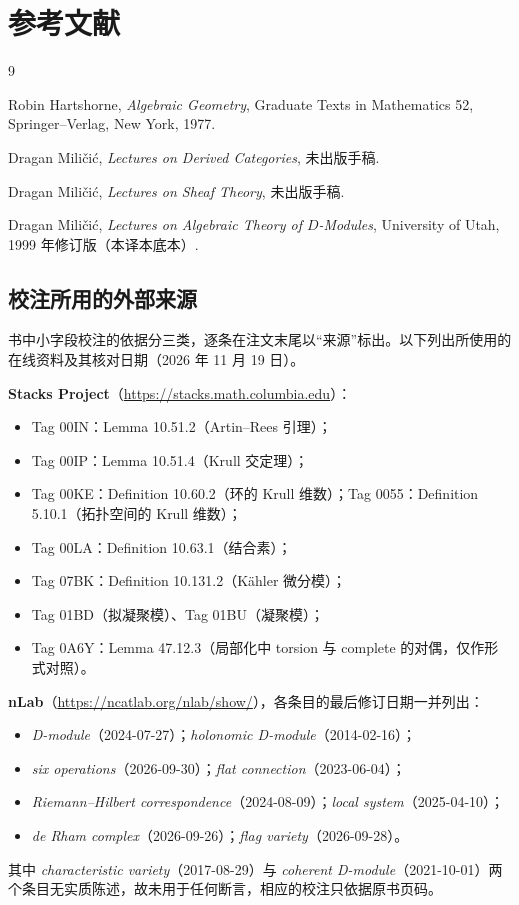 \chapter*{参考文献}

\begin{thebibliography}{9}

 Robin Hartshorne, \emph{Algebraic Geometry}, Graduate Texts in Mathematics 52, Springer--Verlag, New York, 1977.

 Dragan Miličić, \emph{Lectures on Derived Categories}, 未出版手稿.

 Dragan Miličić, \emph{Lectures on Sheaf Theory}, 未出版手稿.

 Dragan Miličić, \emph{Lectures on Algebraic Theory of $D$-Modules}, University of Utah, 1999 年修订版（本译本底本）.

\end{thebibliography}

\section*{校注所用的外部来源}

书中小字段校注的依据分三类，逐条在注文末尾以“来源”标出。以下列出所使用的在线资料及其核对日期（2026 年 11 月 19 日）。

\textbf{Stacks Project}（\url{https://stacks.math.columbia.edu}）：
\begin{itemize}[leftmargin=2.2em,itemsep=0.15em]
  \item Tag 00IN：Lemma 10.51.2（Artin--Rees 引理）；
  \item Tag 00IP：Lemma 10.51.4（Krull 交定理）；
  \item Tag 00KE：Definition 10.60.2（环的 Krull 维数）；Tag 0055：Definition 5.10.1（拓扑空间的 Krull 维数）；
  \item Tag 00LA：Definition 10.63.1（结合素）；
  \item Tag 07BK：Definition 10.131.2（Kähler 微分模）；
  \item Tag 01BD（拟凝聚模）、Tag 01BU（凝聚模）；
  \item Tag 0A6Y：Lemma 47.12.3（局部化中 torsion 与 complete 的对偶，仅作形式对照）。
\end{itemize}

\textbf{nLab}（\url{https://ncatlab.org/nlab/show/}），各条目的最后修订日期一并列出：
\begin{itemize}[leftmargin=2.2em,itemsep=0.15em]
  \item \emph{D-module}（2024-07-27）；\emph{holonomic D-module}（2014-02-16）；
  \item \emph{six operations}（2026-09-30）；\emph{flat connection}（2023-06-04）；
  \item \emph{Riemann--Hilbert correspondence}（2024-08-09）；\emph{local system}（2025-04-10）；
  \item \emph{de Rham complex}（2026-09-26）；\emph{flag variety}（2026-09-28）。
\end{itemize}
其中 \emph{characteristic variety}（2017-08-29）与 \emph{coherent D-module}（2021-10-01）两个条目无实质陈述，故未用于任何断言，相应的校注只依据原书页码。
